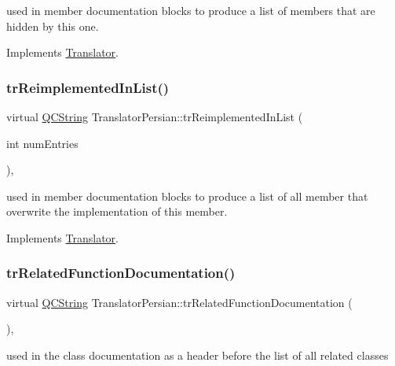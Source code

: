 used in member documentation blocks to produce a list of members that are hidden by this one. 

Implements \mbox{\hyperlink{class_translator}{Translator}}.

\mbox{\label{class_translator_persian_abb546b81293c52326fc04cc2b7fee8d9}} 
\subsubsection{\texorpdfstring{trReimplementedInList()}{trReimplementedInList()}}
{\footnotesize\ttfamily virtual \mbox{\hyperlink{class_q_c_string}{Q\+C\+String}} Translator\+Persian\+::tr\+Reimplemented\+In\+List (\begin{DoxyParamCaption}\item[{int}]{num\+Entries }\end{DoxyParamCaption})\hspace{0.3cm}{\ttfamily [inline]}, {\ttfamily [virtual]}}

used in member documentation blocks to produce a list of all member that overwrite the implementation of this member. 

Implements \mbox{\hyperlink{class_translator}{Translator}}.

\mbox{\label{class_translator_persian_afb7f205623c05b7afcdf96f77f29dfd4}} 
\subsubsection{\texorpdfstring{trRelatedFunctionDocumentation()}{trRelatedFunctionDocumentation()}}
{\footnotesize\ttfamily virtual \mbox{\hyperlink{class_q_c_string}{Q\+C\+String}} Translator\+Persian\+::tr\+Related\+Function\+Documentation (\begin{DoxyParamCaption}{ }\end{DoxyParamCaption})\hspace{0.3cm}{\ttfamily [inline]}, {\ttfamily [virtual]}}

used in the class documentation as a header before the list of all related classes 

